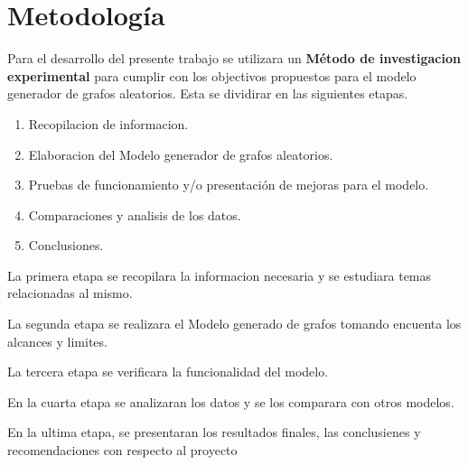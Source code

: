 \documentclass[11pt]{extarticle}
\begin{document}
\section{Metodolog\'ia}
  Para el desarrollo del presente trabajo se utilizara un 
  \textbf{M\'etodo de investigacion experimental} para cumplir con los 
    objectivos propuestos para el modelo generador de grafos aleatorios. 
    Esta se dividirar en las siguientes etapas.
    \begin{enumerate}
      \item Recopilacion de informacion.
      \item Elaboracion del Modelo generador de grafos aleatorios.
      \item Pruebas de funcionamiento y/o presentación de mejoras para el modelo.
      \item Comparaciones y analisis de los datos.
      \item Conclusiones.
    \end{enumerate}
    
    La primera etapa se recopilara la informacion necesaria y
    se estudiara temas relacionadas al mismo.\hfill\break

    La segunda etapa se realizara el Modelo generado de grafos tomando
    encuenta los alcances y limites. \hfill\break

    La tercera etapa se verificara la funcionalidad del modelo.
    \hfill\break

    En la cuarta etapa se analizaran los datos y se los comparara con 
    otros modelos.
    \hfill\break

    En la ultima etapa, se presentaran los resultados finales, las
    conclusienes y recomendaciones con respecto al proyecto
\end{document}
